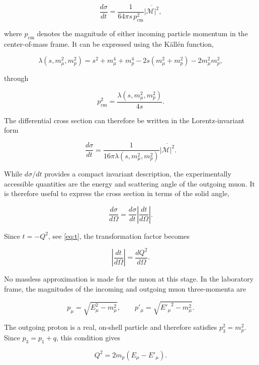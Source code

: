 \[
\frac{d\sigma}{dt}
=
\frac{1}{64\pi s\,p_{\mathrm{cm}}^2}
\overline{|\mathcal{M}|^2},
\]

where \(p_{\mathrm{cm}}\) denotes the magnitude of either incoming particle momentum in the center-of-mass frame. It can be expressed using the Källén function,

\[
\lambda(s,m_\mu^2,m_p^2)
=
s^2+m_\mu^4+m_p^4
-2s(m_\mu^2+m_p^2)
-2m_\mu^2m_p^2,
\]

through

\[
p_{\mathrm{cm}}^2
=
\frac{\lambda(s,m_\mu^2,m_p^2)}{4s}.
\]

The differential cross section can therefore be written in the Lorentz-invariant form

\begin{equation}
\frac{d\sigma}{dt}
=
\frac{1}{16\pi\lambda(s,m_\mu^2,m_p^2)}
\overline{|\mathcal{M}|^2}.
\label{eq:dsigma_dt}
\end{equation}

While \(d\sigma/dt\) provides a compact invariant description, the experimentally accessible quantities are the energy and scattering angle of the outgoing muon. It is therefore useful to express the cross section in terms of the solid angle,

\begin{equation}
\frac{d\sigma}{d\Omega}
=
\frac{d\sigma}{dt}
\left|
\frac{dt}{d\Omega}
\right|.
\end{equation}

Since \(t=-Q^2\), see \autoref{eq:t}, the transformation factor becomes

\begin{equation}
\left|
\frac{dt}{d\Omega}
\right|
=
\frac{dQ^2}{d\Omega}.
\end{equation}

No massless approximation is made for the muon at this stage. In the laboratory frame, the magnitudes of the incoming and outgoing muon three-momenta are

\begin{equation}
p_\mu=\sqrt{E_\mu^2-m_\mu^2},
\qquad
p'_\mu=\sqrt{{E'_\mu}^2-m_\mu^2}.
\end{equation}

The outgoing proton is a real, on-shell particle and therefore satisfies \(p_3^2=m_p^2\). Since \(p_3=p_1+q\), this condition gives

\begin{equation}
Q^2=2m_p(E_\mu-E'_\mu).
\label{eq:Q2_energy_transfer}
\end{equation}


